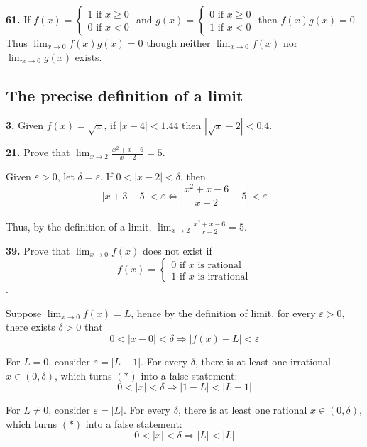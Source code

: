 \documentclass[a4paper,12pt]{article}
\begin{document}
\noindent\textbf{61. }If $f(x) = \begin{cases}
                                   1\text{ if } x \geq 0 \\
                                   0\text{ if } x < 0
                                 \end{cases}$
and $g(x) = \begin{cases}
              0\text{ if } x \geq 0 \\
              1\text{ if } x < 0
            \end{cases}$
then $f(x)g(x) = 0$. Thus $\lim_{x \to 0}f(x)g(x) = 0$ though neither
$\lim_{x \to 0}f(x)$ nor $\lim_{x \to 0}g(x)$ exists.

\subsection{The precise definition of a limit}
\textbf{3. }Given $f(x) = \sqrt{x}$, if $|x - 4| < 1.44$ then
$|\sqrt{x} - 2| < 0.4$.

\noindent\textbf{21. }Prove that $\lim_{x \to 2}\frac{x^2 + x - 6}{x - 2} = 5$.

Given $\varepsilon > 0$, let $\delta = \varepsilon$.
If $0 < |x - 2| < \delta$, then \[|x + 3 - 5| < \varepsilon
\iff \left|\frac{x^2 + x - 6}{x - 2} - 5\right| < \varepsilon\]

Thus, by the definition of a limit,
$\lim_{x \to 2}\frac{x^2 + x - 6}{x - 2} = 5$.

\noindent\textbf{39. }Prove that $\lim_{x \to 0}f(x)$ does not exist if
\[f(x) = \begin{cases}
           0\text{ if } x\text{ is rational} \\
           1\text{ if } x\text{ is irrational}
         \end{cases}\].

Suppose $\lim_{x \to 0}f(x) = L$, hence by the definition of limit,
for every $\varepsilon > 0$, there exists $\delta > 0$ that
\[0 < |x - 0| < \delta \Rightarrow |f(x) - L| < \varepsilon \tag{$*$}\]

For $L = 0$, consider $\varepsilon = |L - 1|$. For every $\delta$, there is
at least one irrational $x \in (0, \delta)$, which turns $(*)$ into a false
statement: \[0 < |x| < \delta \Rightarrow |1 - L| < |L - 1|\]

For $L \neq 0$, consider $\varepsilon = |L|$. For every $\delta$, there is
at least one rational $x \in (0, \delta)$, which turns $(*)$ into a false
statement: \[0 < |x| < \delta \Rightarrow |L| < |L|\]
\end{document}

